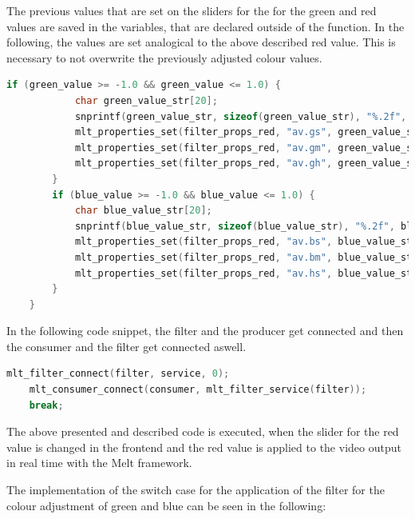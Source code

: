 \documentclass[../MasterThesis.tex]{subfiles}
\begin{document}
The previous values that are set on the sliders for the for the green and red values are saved in the variables, that are declared outside of the function. In the following, the values are set analogical to the above described red value. This is necessary to not overwrite the previously adjusted colour values.
	
\begin{lstlisting}[language=c, numbers=none, columns=fullflexible]
		if (green_value >= -1.0 && green_value <= 1.0) {
			char green_value_str[20]; 
			snprintf(green_value_str, sizeof(green_value_str), "%.2f", green_value);
			mlt_properties_set(filter_props_red, "av.gs", green_value_str);
			mlt_properties_set(filter_props_red, "av.gm", green_value_str);	
			mlt_properties_set(filter_props_red, "av.gh", green_value_str);
		} 			
		if (blue_value >= -1.0 && blue_value <= 1.0) {
			char blue_value_str[20]; 
			snprintf(blue_value_str, sizeof(blue_value_str), "%.2f", blue_value);
			mlt_properties_set(filter_props_red, "av.bs", blue_value_str);
			mlt_properties_set(filter_props_red, "av.bm", blue_value_str);	
			mlt_properties_set(filter_props_red, "av.hs", blue_value_str);
		}					
	}
\end{lstlisting}

In the following code snippet, the filter and the producer get connected and then the consumer and the filter get connected aswell.


\begin{lstlisting}[language=c, numbers=none, columns=fullflexible]
	mlt_filter_connect(filter, service, 0);
	mlt_consumer_connect(consumer, mlt_filter_service(filter));
	break;			
\end{lstlisting}

The above presented and described code is executed, when the slider for the red value is changed in the frontend and the red value is applied to the video output in real time with the Melt framework.

The implementation of the switch case for the application of the filter for the colour adjustment of green and blue can be seen in the following:

\newpage
\end{document}
